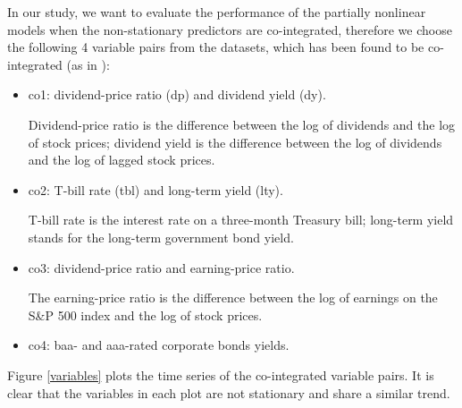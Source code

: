 \documentclass[a4paper,12pt,times,numbered,print,index]{report}
\numberwithin{equation}{section}
\begin{document}
In our study, we want to evaluate the performance of the partially nonlinear models when the non-stationary predictors are co-integrated, therefore we choose the following 4 variable pairs from the \cite{welch2008comprehensive} datasets, which has been found to be co-integrated (as in \cite{zhou2018semiparametric}): 
\begin{itemize}
	\item co1: dividend-price ratio (dp) and dividend yield (dy). 
	
	Dividend-price ratio is the difference between the log of dividends and the log of stock prices; dividend yield is the difference between the log of dividends and the log of lagged stock prices.
	
	\item co2: T-bill rate (tbl) and long-term yield (lty).
	
	T-bill rate is the interest rate on a three-month Treasury bill; long-term yield stands for the long-term government bond yield.
	
	\item co3: dividend-price ratio and earning-price ratio.
	
	The earning-price ratio is the difference between the log of earnings on the S\&P 500 index and the log of stock prices.
	
	\item co4: baa- and aaa-rated corporate bonds yields. 
\end{itemize}

Figure \ref{variables} plots the time series of the co-integrated variable pairs. It is clear that the variables in each plot are not stationary and share a similar trend.
\end{document}
